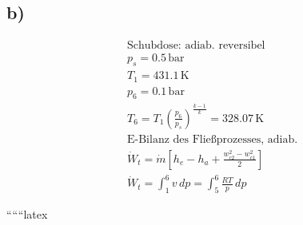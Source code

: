 

\subsection*{b)}

\begin{align*}
    &\text{Schubdose: adiab. reversibel} \\
    &p_s = 0.5 \, \text{bar} \\
    &T_1 = 431.1 \, \text{K} \\
    &p_6 = 0.1 \, \text{bar} \\
    &T_6 = T_1 \left( \frac{p_6}{p_s} \right)^{\frac{k-1}{k}} = 328.07 \, \text{K} \\
    &\text{E-Bilanz des Fließprozesses, adiab.} \\
    &\dot{W}_t = \dot{m} \left[ h_e - h_a + \frac{w_{c2}^2 - w_{c1}^2}{2} \right] \\
    &\dot{W}_t = \int_{1}^{6} v \, dp = \int_{5}^{6} \frac{R T}{p} \, dp
\end{align*}

``````latex